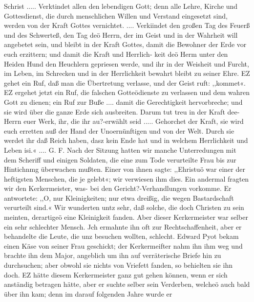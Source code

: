 Schrist ..... Verktindet allen den lebendigen Gott; denn alle
Lehre, Kirche und Gottesdienst, die durch menschlichen Willen und
Verstand eingesetzt sind, werden von der Kraft Gottes vernichtet.
.... Verkiindet den großen Tag des Feuerß und des Schwerteß,
den Tag deö Herrn, der im Geist und in der Wahrheit will
angebetet sein, und bleibt in der Kraft Gottes, damit die Bewohner
der Erde vor euch erzittern; und damit die Kraft und Herrlich-
keit deö Herm unter den Heiden Hund den Heuchlern gepriesen
werde, und ihr in der Weisheit und Furcht, im Leben, im Schrecken
und in der Herrlichkeit bewahrt bleibt zu seiner Ehre. EZ gehet
ein Ruf, daß man die Übertretung verlasse, und der Geist ruft:
,,kommet«. EZ ergehet jetzt ein Ruf, die falschen Gotteödienste
zu verlassen und dem wahren Gott zu dienen; ein Ruf zur
Buße .... damit die Gerechtigkeit hervorbreche; und sie wird
über die ganze Erde sich ausbreiten. Darum tut treu in der
Kraft dee- Herrn euer Werk, ihr, die ihr au?-erwählt seid .....
Gehorchet der Kraft, sie wird euch erretten auß der Hand der
Unoernünftigen und von der Welt. Durch sie werdet ihr daß
Reich haben, dasz kein Ende hat und in welchem Herrlichkeit und
Leben isi.« .... G. F.
Nach der Sitzung hatten wir manche Unterredungen mit dem
Scheriff und einigen Soldaten, die eine zum Tode verurteilte Frau
bis zur Hintichnmg überwachen mußten. Einer von ihnen sagte:
,,Ehristuö war einer der heftigsten Menschen, die je gelebt«; wir
verwiesen ihm dies. Ein andermal fragten wir den Kerkermeister,
was- bei den Gericht?-Verhandlungen vorkomme. Er antwortete:
,,O, nur Kleinigkeiten; nur etwa dreißig, die wegen Bastardschaft
verurteilt sind.« Wir wunderten untz sehr, daß solche, die doch
Christen zu sein meinten, derartigeö eine Kleinigkeit fanden.
Aber dieser Kerkermeister war selber ein sehr schlechter Mensch.
Jch ermahnte ihn oft zur Rechtschaffenheit, aber er behandelte
die Leute, die unz besuchen wollten, schlecht. Edward Pyot bekam
einen Käse von seiner Frau geschickt; der Kerkermeifter nahm ihn
ihm weg und brachte ihn dem Major, angeblich um ihn auf
verräterische Briefe hin zu durchsuchen; aber obwohl sie nichts
von Vriefett fanden, so behielten sie ihn doch. EZ hätte diesem
Kerkermeister ganz gut gehen können, wenn er sich anständig
betragen hätte, aber er suchte selber sein Verderben, welcheö auch
bald über ihn kam; denn im darauf folgenden Jahre wurde er


